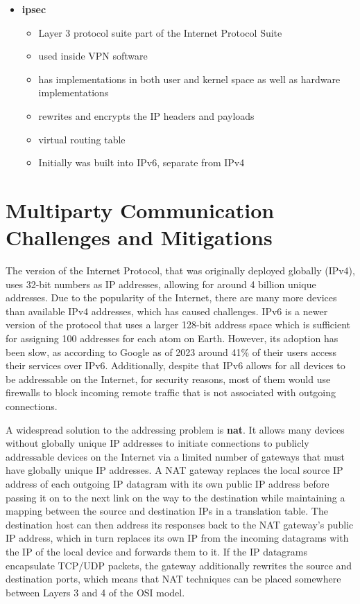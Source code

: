\begin{itemize}
\tightlist
\item
  \textbf{\acrfull{ipsec}}

  \begin{itemize}
  \tightlist
  \item
    Layer 3 protocol suite part of the Internet Protocol Suite
  \item
    used inside VPN software
  \item
    has implementations in both user and kernel space as well as
    hardware implementations
  \item
    rewrites and encrypts the IP headers and payloads
  \item
    virtual routing table
  \item
    Initially was built into IPv6, separate from IPv4
  \end{itemize}
\end{itemize}

\hypertarget{multiparty-communication-challenges-and-mitigations}{%
\section{Multiparty Communication Challenges and
Mitigations}\label{multiparty-communication-challenges-and-mitigations}}

The version of the Internet Protocol, that was originally deployed
globally (IPv4), uses 32-bit numbers as IP addresses, allowing for
around 4 billion unique addresses. Due to the popularity of the
Internet, there are many more devices than available IPv4 addresses,
which has caused challenges. IPv6 is a newer version of the protocol
that uses a larger 128-bit address space which is sufficient for
assigning 100 addresses for each atom on Earth. However, its adoption
has been slow, as according to Google\autocite{IPv6Google} as of 2023
around 41\% of their users access their services over IPv6.
Additionally, despite that IPv6 allows for all devices to be addressable
on the Internet, for security reasons, most of them would use firewalls
to block incoming remote traffic that is not associated with outgoing
connections.

A widespread solution to the addressing problem is \textbf{\gls{nat}}.
It allows many devices without globally unique IP addresses to initiate
connections to publicly addressable devices on the Internet via a
limited number of gateways that must have globally unique IP addresses.
A NAT gateway replaces the local source IP address of each outgoing IP
datagram with its own public IP address before passing it on to the next
link on the way to the destination while maintaining a mapping between
the source and destination IPs in a translation table. The destination
host can then address its responses back to the NAT gateway's public IP
address, which in turn replaces its own IP from the incoming datagrams
with the IP of the local device and forwards them to it. If the IP
datagrams encapsulate TCP/UDP packets, the gateway additionally rewrites
the source and destination ports, which means that NAT techniques can be
placed somewhere between Layers 3 and 4 of the OSI model.

